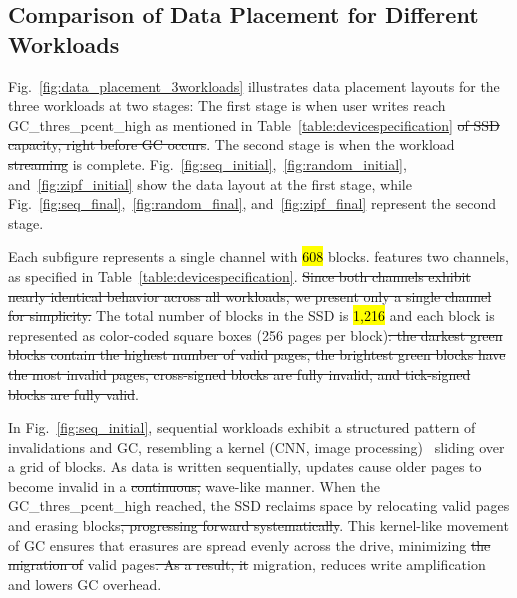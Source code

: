 \documentclass{ieeeaccess}
\begin{document}
\subsection{Comparison of Data Placement for Different Workloads}
\label{subsec:ComparisonDataPlacement}
Fig.~\ref{fig:data_placement_3workloads} illustrates data placement layouts for the three workloads at two stages: The first stage is when user writes reach GC\_thres\_pcent\_high as mentioned in Table~\ref{table:devicespecification}\sout{ of SSD capacity, right before GC occurs}. The second stage is when the workload \sout{streaming} is complete.
Fig.~\ref{fig:seq_initial},~\ref{fig:random_initial}, and~\ref{fig:zipf_initial} show the data layout at the first stage, while Fig.~\ref{fig:seq_final},~\ref{fig:random_final}, and~\ref{fig:zipf_final} represent the second stage.

Each subfigure represents a single channel with \hl{608} blocks. \eyanassdsim features two channels, as specified in Table~\ref{table:devicespecification}. \sout{Since both channels exhibit nearly identical behavior across all workloads, we present only a single channel for simplicity.} The total number of blocks in the SSD is \hl{1,216} and each block is represented as color-coded square boxes (256 pages per block)\sout{: the darkest green blocks contain the highest number of valid pages, the brightest green blocks have the most invalid pages, cross-signed blocks are fully invalid, and tick-signed blocks are fully valid}.


In Fig.~\ref{fig:seq_initial}, sequential workloads exhibit a structured pattern of invalidations and GC, resembling a kernel (CNN, image processing)~\cite{kernel} sliding over a grid of blocks. As data is written sequentially, updates cause older pages to become invalid in a \sout{continuous,} wave-like manner. When the GC\_thres\_pcent\_high reached, the SSD reclaims space by relocating valid pages and erasing blocks\sout{, progressing forward systematically}. This kernel-like movement of GC ensures that erasures are spread evenly across the drive, minimizing \sout{the migration of} valid pages\sout{. As a result, it} migration, reduces write amplification and lowers GC overhead.
\end{document}
